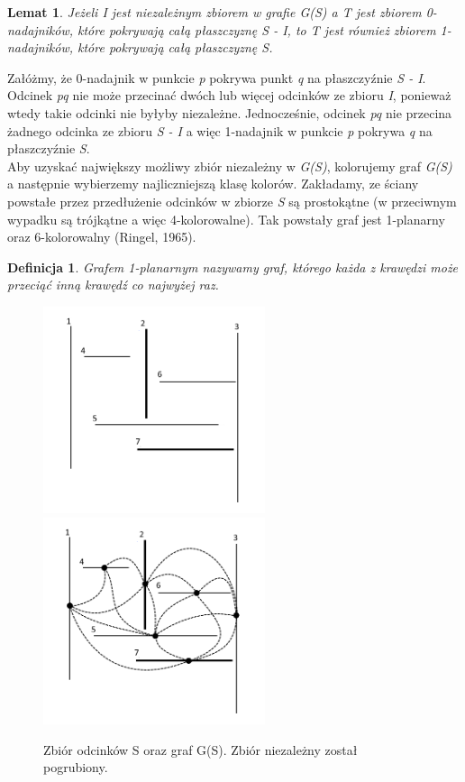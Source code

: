 \documentclass[brudnopis]{xmgr}
\newtheorem{Lemat}{Lemat}
\newtheorem{Definicja}{Definicja}
\begin{document}
\begin{Lemat}\label{0-1-nadajniki}
  Jeżeli I jest niezależnym zbiorem w grafie G(S) a T jest zbiorem 0-nadajników, które pokrywają całą płaszczyznę S - I, to T jest również zbiorem 1-nadajników, które pokrywają całą płaszczyznę S.
\end{Lemat}

\indent Załóżmy, że 0-nadajnik w punkcie \textit{p} pokrywa punkt \textit{q} na płaszczyźnie \textit{S - I}. Odcinek \textit{pq} nie może przecinać dwóch lub więcej odcinków ze zbioru \textit{I}, ponieważ wtedy takie odcinki nie byłyby niezależne. Jednocześnie, odcinek \textit{pq} nie przecina żadnego odcinka ze zbioru \textit{S - I} a więc 1-nadajnik w punkcie \textit{p} pokrywa \textit{q} na płaszczyźnie \textit{S}.
\\\indent Aby uzyskać największy możliwy zbiór niezależny w \textit{G(S)}, kolorujemy graf \textit{G(S)} a następnie wybierzemy najliczniejszą klasę kolorów. Zakładamy, ze ściany powstałe przez przedłużenie odcinków w zbiorze \textit{S} są prostokątne (w przeciwnym wypadku są trójkątne a więc 4-kolorowalne). 
Tak powstały graf jest 1-planarny oraz 6-kolorowalny (Ringel, 1965).

\begin{Definicja}
  Grafem 1-planarnym nazywamy graf, którego każda z krawędzi może przeciąć inną krawędź co najwyżej raz.
\end{Definicja}
\begin{figure}[ht!]
  \centering
  \includegraphics[width=6.5cm]{rysunki/zbior_odcinkow.png}
  \includegraphics[width=6.5cm]{rysunki/graf_zbioru_odcinkow.png}
  \caption{Zbiór odcinków S oraz graf G(S). Zbiór niezależny został pogrubiony.}
  \label{fig:przedluzone odcinki}
\end{figure} 
\end{document}

